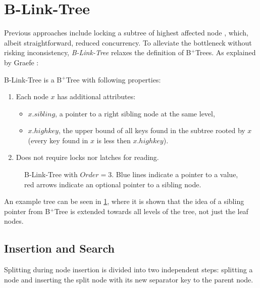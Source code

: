 \section{B-Link-Tree}\label{section:b-link-tree}

Previous approaches include locking a subtree of highest affected node \cite{samadi1976b}, which, albeit straightforward, reduced concurrency. To alleviate the bottleneck without risking inconsistency, \textit{B-Link-Tree} relaxes the definition of B$^+$Trees. As explained by Graefe \cite{goetz-tech}:

\begin{definition}
  B-Link-Tree is a B$^+$Tree with following properties:
  \begin{enumerate}
    \item Each node $x$ has additional attributes:
          \begin{itemize}
            \item $x.\mathit{sibling}$, a pointer to a right sibling node at the same level,
            \item $x.highkey$, the upper bound of all keys found in the subtree rooted by $x$ (every key found in $x$ is less then $x.highkey$).
          \end{itemize}
    \item Does not require locks nor latches for reading.
  \end{enumerate}
\end{definition}

\begin{figure}[H]
  \centering
  
  \caption[B-Link-Tree with $\mathit{Order} = 3$.]{B-Link-Tree with $\mathit{Order} = 3$. Blue lines indicate a pointer to a value, red arrows indicate an optional pointer to a sibling node.}
  \label{figure:b-link-tree}
\end{figure}

An example tree can be seen in \cref{figure:b-link-tree}, where it is shown that the idea of a sibling pointer from B$^+$Tree is extended towards all levels of the tree, not just the leaf nodes.

\subsection{Insertion and Search}

Splitting during node insertion is divided into two independent steps: splitting a node and inserting the split node with its new separator key to the parent node.

